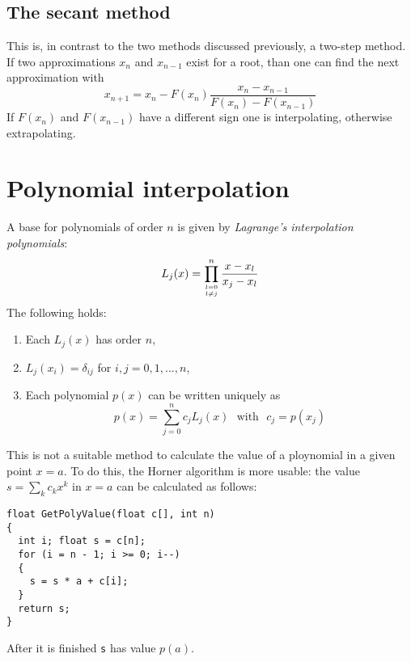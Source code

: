 \documentclass[a4paper,fancyheadings,twoside]{report}
\begin{document}
\subsection{The secant method}
This is, in contrast to the two methods discussed previously, a two-step
method. If two approximations $x_n$ and $x_{n-1}$ exist for a root, than
one can find the next approximation with
\[
x_{n+1}=x_n-F(x_n)\frac{x_n-x_{n-1}}{F(x_n)-F(x_{n-1})}
\]
If $F(x_n)$ and $F(x_{n-1})$ have a different sign one is interpolating,
otherwise extrapolating.

\section{Polynomial interpolation}
A base for polynomials of order $n$ is given by {\it Lagrange's interpolation
polynomials}:
\[
L_j(x)=\prod_{{l=0}\atop{l\neq j}}^n\frac{x-x_l}{x_j-x_l}
\]
The following holds:
\begin{enumerate}
\item Each $L_j(x)$ has order $n$,
\item $L_j(x_i)=\delta_{ij}$ for $i,j=0,1,...,n$,
\item Each polynomial $p(x)$ can be written uniquely as
\[
p(x)=\sum_{j=0}^n c_jL_j(x)~~~\mbox{with}~~~c_j=p(x_j)
\]
\end{enumerate}
This is not a suitable method to calculate the value of a ploynomial in a
given point $x=a$. To do this, the Horner algorithm is more usable: the
value $s=\sum_k c_kx^k$ in $x=a$ can be calculated as follows:
\begin{verbatim}
float GetPolyValue(float c[], int n)
{
  int i; float s = c[n];
  for (i = n - 1; i >= 0; i--)
  {
    s = s * a + c[i];
  }
  return s;
}
\end{verbatim}
After it is finished {\tt s} has value $p(a)$.
\end{document}
